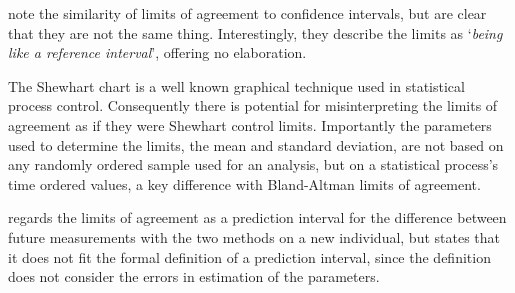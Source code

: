 \documentclass[12pt, a4paper]{report}
\theoremstyle{plain}
\theoremstyle{definition}
\theoremstyle{remark}
\begin{document}
%


\citet{BA99} note the similarity of limits of agreement to
confidence intervals, but are clear that they are not the same thing. Interestingly, they describe the limits as `\textit{being like a reference interval}', offering no elaboration.

The Shewhart chart is a well known graphical
technique used in statistical process control. Consequently
there is potential for misinterpreting the limits of agreement as
if they were Shewhart control limits. Importantly the
parameters used to determine the limits, the mean and standard
deviation, are not based on any randomly ordered sample used for an analysis, but on a statistical process's time ordered values, a key difference with Bland-Altman limits of agreement.


\citet{BXC2008} regards the limits of agreement as a prediction interval for the difference between future measurements with the two methods on a new individual, but states that it does not fit the formal definition of a prediction interval, since the
definition does not consider the errors in estimation of the parameters. 
\end{document}
